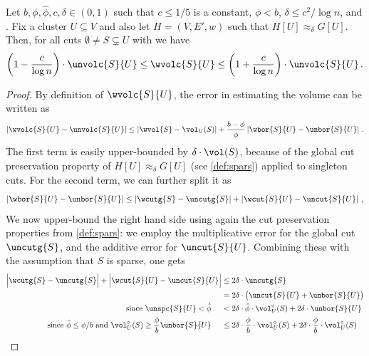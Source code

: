 \begin{lemma}
	\label{lem:volumesparsecuts}
	Let $b, \phi,\hat{\phi}, c,\delta \in (0,1)$ such that $c \leq 1/5$ is a constant, $\phi < b$, $\delta \le c^2 / \log n$, and . Fix a cluster $U \subseteq V$ and also let $H=(V,E',w)$ such that $H[U] \approx_\delta G[U]$. Then, for all cuts $\emptyset \neq S \subsetneq U$ with  we have
	\begin{equation*}
		\left(1-\frac{c}{\log n}\right) \cdot \unvolc{S}{U} \le \wvolc{S}{U} \le \left(1+\frac{c}{\log n}\right) \cdot \unvolc{S}{U} \, .
	\end{equation*}
\end{lemma}
\begin{proof}
	By definition of $\wvolc{S}{U}$, the error in estimating the volume can be written as
	\begin{equation}
		\left|\wvolc{S}{U}- \unvolc{S}{U}\right| \le \left|\wvol{S}- \vol_U(S)\right| + \frac{b-\phi}{\phi}\left|\wbor{S}{U} - \unbor{S}{U}\right| \, . \label{eq:triangineqselfloops}
	\end{equation}
	The first term is easily upper-bounded by $\delta \cdot \vol(S)$, because of the global cut preservation property of $H[U] \approx_\delta G[U]$ (see \cref{def:spars}) applied to singleton cuts. For the second term, we can further split it as
	\begin{equation}
		\left|\wbor{S}{U} - \unbor{S}{U}\right| \le \left|\wcutg{S}-\uncutg{S}\right|+\left|\wcut{S}{U}-\uncut{S}{U}\right| \, , \label{eq:trianginequality}
	\end{equation}
We now upper-bound the right hand side using again the cut preservation properties from \cref{def:spars}: we employ the multiplicative error for the global cut $\uncutg{S}$, and the additive error for $\uncut{S}{U}$. Combining these with the assumption that $S$ is sparse, one gets
	\begin{align}
		\Big|\wcutg{S} - \uncutg{S}\Big| + \Big|\wcut{S}{U}-\uncut{S}{U}\Big| 
		& \le  2\delta\cdot \uncutg{S} \\
		& =   2\delta \cdot\big(\uncut{S}{U} + \unbor{S}{U}\big) \\
		  \text{ since $\unspc{S}{U} < \hat{\phi}$ } \quad & <  2\delta \cdot \hat{\phi} \cdot \vol_U^\circ(S) + 2\delta \cdot \unbor{S}{U}\\
	 \text{ since $\hat{\phi} \le \phi/b$ and $\vol_U^{\circ}(S) \ge \frac{\phi}{b}\unbor{S}{U}$ } \quad & \le 2\delta \cdot \frac{\phi}{b} \cdot \vol_U^\circ(S) + 2\delta \cdot \frac{\phi}{b} \cdot \vol_U^{\circ}(S)\\

\end{align}
\end{proof}
